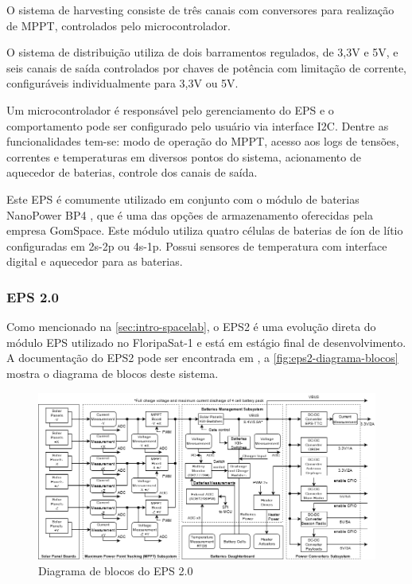 O sistema de harvesting consiste de três canais com conversores para realização de \gls{MPPT}, controlados pelo microcontrolador.

O sistema de distribuição utiliza de dois barramentos regulados, de 3,3V e 5V, e seis canais de saída controlados por chaves de potência com limitação de corrente, configuráveis individualmente para 3,3V ou 5V.

Um microcontrolador é responsável pelo gerenciamento do \gls{EPS} e o comportamento pode ser configurado pelo usuário via interface \gls{I2C}.
Dentre as funcionalidades tem-se: modo de operação do \gls{MPPT}, acesso aos logs de tensões, correntes e temperaturas em diversos pontos do sistema, acionamento de aquecedor de baterias, controle dos canais de saída.

Este EPS é comumente utilizado em conjunto com o módulo de baterias NanoPower BP4 \cite{bp4-datasheet}, que é uma das opções de armazenamento oferecidas pela empresa GomSpace.
Este módulo utiliza quatro células de baterias de íon de lítio configuradas em 2s-2p ou 4s-1p. Possui sensores de temperatura com interface digital e aquecedor para as baterias.



\subsubsection{EPS 2.0}

Como mencionado na \autoref{sec:intro-spacelab}, o \gls{EPS2} é uma evolução direta do módulo \gls{EPS} utilizado no FloripaSat-1 \cite{floripasat-1} e está em estágio final de desenvolvimento. A documentação do \gls{EPS2} pode ser encontrada em \cite{eps2-doc}, a \autoref{fig:eps2-diagrama-blocos} mostra o diagrama de blocos deste sistema.

\begin{figure}[htp]
    \caption{Diagrama de blocos do EPS 2.0}
    \begin{center}
        \includegraphics[width=\textwidth, keepaspectratio]{images/eps2-power-diagram.png}
    \end{center}
    \label{fig:eps2-diagrama-blocos}
\end{figure}

